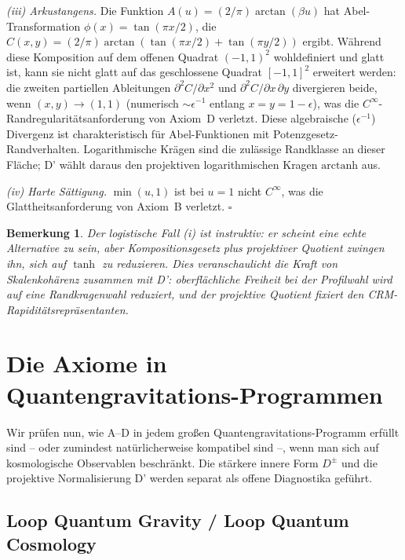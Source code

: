 \documentclass[aps,prd,twocolumn,superscriptaddress,nofootinbib]{revtex4-2}
\newtheorem{remark}{Bemerkung}
\begin{document}
\textit{(iii) Arkustangens.} Die Funktion $A(u) = (2/\pi)\arctan(\beta u)$ hat Abel-Transformation $\phi(x) = \tan(\pi x/2)$, die $C(x,y) = (2/\pi)\arctan(\tan(\pi x/2) + \tan(\pi y/2))$ ergibt. Während diese Komposition auf dem offenen Quadrat $(-1,1)^2$ wohldefiniert und glatt ist, kann sie nicht glatt auf das geschlossene Quadrat $[-1,1]^2$ erweitert werden: die zweiten partiellen Ableitungen $\partial^2 C/\partial x^2$ und $\partial^2 C/\partial x\,\partial y$ divergieren beide, wenn $(x,y) \to (1,1)$ (numerisch $\sim \epsilon^{-1}$ entlang $x = y = 1 - \epsilon$), was die $C^\infty$-Randregularitätsanforderung von Axiom~D verletzt. Diese algebraische ($\epsilon^{-1}$) Divergenz ist charakteristisch für Abel-Funktionen mit Potenzgesetz-Randverhalten. Logarithmische Krägen sind die zulässige Randklasse an dieser Fläche; D' wählt daraus den projektiven logarithmischen Kragen $\mathrm{arctanh}$ aus.

\textit{(iv) Harte Sättigung.} $\min(u, 1)$ ist bei $u = 1$ nicht $C^\infty$, was die Glattheitsanforderung von Axiom~B verletzt. \hfill $\square$

\begin{remark}
Der logistische Fall (i) ist instruktiv: er scheint eine echte Alternative zu sein, aber Kompositionsgesetz plus projektiver Quotient zwingen ihn, sich auf $\tanh$ zu reduzieren. Dies veranschaulicht die Kraft von Skalenkohärenz zusammen mit D': oberflächliche Freiheit bei der Profilwahl wird auf eine Randkragenwahl reduziert, und der projektive Quotient fixiert den CRM-Rapiditätsrepräsentanten.
\end{remark}


\section{Die Axiome in Quantengravitations-Programmen}
\label{sec:qg}

Wir prüfen nun, wie A--D in jedem großen Quantengravitations-Programm erfüllt sind -- oder zumindest natürlicherweise kompatibel sind --, wenn man sich auf kosmologische Observablen beschränkt. Die stärkere innere Form $D^\pm$ und die projektive Normalisierung D' werden separat als offene Diagnostika geführt.

\subsection{Loop Quantum Gravity / Loop Quantum Cosmology}
\end{document}
